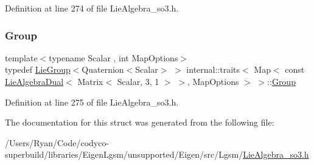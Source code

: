 Definition at line 274 of file Lie\+Algebra\+\_\+so3.\+h.

\hypertarget{structinternal_1_1traits_3_01_map_3_01const_01_lie_algebra_dual_3_01_matrix_3_01_scalar_00_013_0e77a233aa7e2f28dddf71e39df1dd866_af93405032a1b0062e9c3ca662f0cfcbe}{}\label{structinternal_1_1traits_3_01_map_3_01const_01_lie_algebra_dual_3_01_matrix_3_01_scalar_00_013_0e77a233aa7e2f28dddf71e39df1dd866_af93405032a1b0062e9c3ca662f0cfcbe} 
\subsubsection{\texorpdfstring{Group}{Group}}
{\footnotesize\ttfamily template$<$typename Scalar , int Map\+Options$>$ \\
typedef \hyperlink{class_lie_group}{Lie\+Group}$<$Quaternion$<$Scalar$>$ $>$ internal\+::traits$<$ Map$<$ const \hyperlink{class_lie_algebra_dual}{Lie\+Algebra\+Dual}$<$ Matrix$<$ Scalar, 3, 1 $>$ $>$, Map\+Options $>$ $>$\+::\hyperlink{structinternal_1_1traits_3_01_map_3_01const_01_lie_algebra_dual_3_01_matrix_3_01_scalar_00_013_0e77a233aa7e2f28dddf71e39df1dd866_af93405032a1b0062e9c3ca662f0cfcbe}{Group}}



Definition at line 275 of file Lie\+Algebra\+\_\+so3.\+h.



The documentation for this struct was generated from the following file\+:\begin{DoxyCompactItemize}
\item 
/\+Users/\+Ryan/\+Code/codyco-\/superbuild/libraries/\+Eigen\+Lgsm/unsupported/\+Eigen/src/\+Lgsm/\hyperlink{_lie_algebra__so3_8h}{Lie\+Algebra\+\_\+so3.\+h}\end{DoxyCompactItemize}
